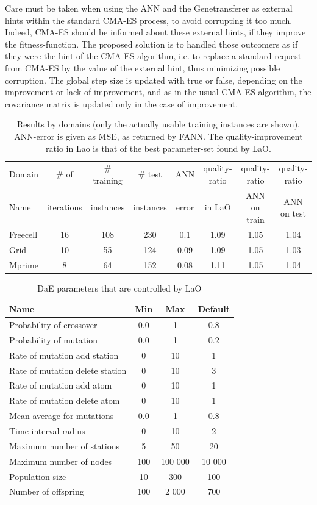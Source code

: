 \documentclass{MYsig-alternate}
\begin{document}
Care must be taken when using the ANN and the Genetransferer as external hints within the standard CMA-ES process, to avoid corrupting it too much. Indeed, CMA-ES should be informed about these external hints, if they improve the fitness-function. The proposed solution is to handled those outcomers as if they were the hint of the CMA-ES algorithm, i.e. to replace a standard request from CMA-ES by the value of the external hint, thus minimizing possible corruption. The global step size is updated with true or false, depending on the improvement or lack of improvement, and as in the usual CMA-ES algorithm, the covariance matrix is updated only in the case of improvement.

\begin{table}[ht]
\centering
\begin{tabular}{l c c c c c c c}
\hline\hline
Domain & \# of & \# training & \# test &  ANN & quality-ratio & quality-ratio & quality-ratio \\ 
Name & iterations  & instances &  instances &  error & in LaO & ANN on train & ANN on test \\ 
\hline
Freecell& 16 & 108 & 230 & 0.1 & 1.09 & 1.05 & 1.04  \\
Grid & 10 & 55 & 124 & 0.09 & 1.09 & 1.05 & 1.03  \\
Mprime & 8 & 64 & 152 & 0.08 & 1.11 & 1.05 & 1.04   \\
\hline
\end{tabular}
\caption{Results by domains (only the actually usable training instances are shown). ANN-error is given as MSE, as returned by FANN. The quality-improvement ratio in Lao is that of the best parameter-set found by LaO.}
\label{table:domains}
\end{table} 


\begin{table}[ht]
\centering
\begin{tabular}{l c c c}
\hline\hline
Name & Min & Max & Default \\ 
\hline
Probability of crossover & 0.0 & 1 & 0.8 \\
Probability of mutation & 0.0& 1& 0.2 \\
Rate of mutation add station& 0& 10& 1 \\
Rate of mutation delete station& 0& 10& 3 \\
Rate of mutation add atom& 0& 10& 1 \\
Rate of mutation delete atom& 0& 10& 1 \\
Mean average for mutations& 0.0& 1& 0.8 \\
Time interval radius& 0& 10& 2 \\
Maximum number of stations& 5& 50& 20 \\
Maximum number of nodes& 100& 100 000& 10 000 \\
Population size& 10& 300& 100 \\
Number of offspring & 100& 2 000& 700 \\
\hline
\end{tabular}
\caption{DaE parameters that are controlled by LaO}
\label{table:parameters}
\end{table} 
\end{document}
